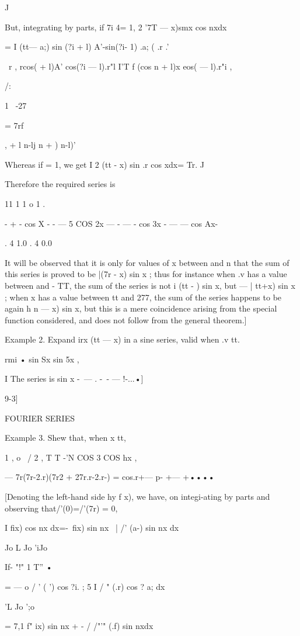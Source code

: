 J

But, integrating by parts, if 7i 4= 1, 2 '7T — x)smx cos nxdx

= I (tt— a;) sin (?i + l) A'-sin(?i- 1) .a; ( .r .'

\ r , rcos( + l)A' cos(?i — l).r"l I'T f (cos n + l)x eos( — l).r"i ,

/:

1 \ -27

= 7rf

, + l n-lj n + ) n-l)'

Whereas if = 1, we get I 2 (tt - x) sin .r cos xdx= Tr. J

Therefore the required series is

11 1 1 o 1 .

- + - cos X - - — 5 COS 2x — - — - cos 3x - — — cos Ax-

. 4 1.0 . 4 0.0

It will be observed that it is only for values of x between and n that
the sum of this series is proved to be |(7r - x) sin x ; thus for
instance when .v has a value between and - TT, the sum of the series
is not i (tt - ) sin x, but — | tt+x) sin x ; when x has a value
between tt and 277, the sum of the series happens to be again h n — x)
sin x, but this is a mere coincidence arising from the special
function considered, and does not follow from the general theorem.]

Example 2. Expand irx (tt — x) in a sine series, valid when .v tt.

rmi • sin Sx sin 5x ,

I The series is sin x -\ — . -\ - — !-...•]

9-3]

FOURIER SERIES

Example 3. Shew that, when x tt,

1 , o \ / 2 , T T -'N COS 3 COS hx ,

— 7r(7r-2.r)(7r2 + 27r.r-2.r-) = cos.r+— p- +— +••••

[Denoting the left-hand side hy f x), we have, on integi-ating by
parts and observing that/'(0)=/'(7r) = 0,

I fix) cos nx dx=-\ fix) sin nx \ | /' (a-) sin nx dx

Jo L Jo 'iJo

If- "!" 1 T'' •

= — o / ' ( ') cos ?i. ; 5 I / " (.r) cos ? a; dx

 'L Jo ';o

= 7,1 f" ix) sin nx + - / /"'" (.f) sin nxdx

